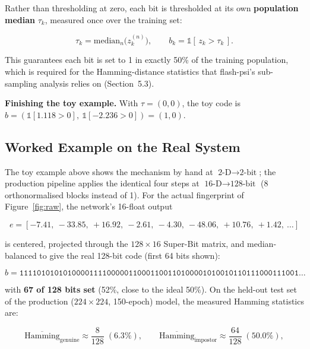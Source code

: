 \documentclass[11pt]{article}
\begin{document}
Rather than thresholding at zero, each bit is thresholded at its own \textbf{population
median} $\tau_k$, measured once over the training set:

\begin{equation}
\tau_k = \mathrm{median}_n\big(z_k^{(n)}\big), \qquad
b_k = \mathbb{1}[\,z_k > \tau_k\,].
\end{equation}

This guarantees each bit is set to 1 in exactly 50\% of the training population, which is
required for the Hamming-distance statistics that flash-psi's sub-sampling analysis relies
on (Section~5.3).

\textbf{Finishing the toy example.} With $\tau = (0, 0)$, the toy code is
$b = (\mathbb{1}[1.118>0],\ \mathbb{1}[-2.236>0]) = (1, 0)$.

\subsection{Worked Example on the Real System}

The toy example above shows the mechanism by hand at $\text{2-D}\to\text{2-bit}$; the
production pipeline applies the identical four steps at
$\text{16-D}\to\text{128-bit}$ (8 orthonormalised blocks instead of 1). For the actual
fingerprint of Figure~\ref{fig:raw}, the network's 16-float output

\begin{equation}
e = [-7.41,\ -33.85,\ +16.92,\ -2.61,\ -4.30,\ -48.06,\ +10.76,\ +1.42,\ \ldots]
\end{equation}

is centered, projected through the $128\times16$ Super-Bit matrix, and median-balanced to
give the real 128-bit code (first 64 bits shown):

\begin{equation}
b = \texttt{1111010101010000111100000110001100110100001010010110111000111001\ldots}
\end{equation}

with \textbf{67 of 128 bits set} (52\%, close to the ideal 50\%). On the held-out test set
of the production ($224\times224$, 150-epoch) model, the measured Hamming statistics are:

\begin{equation}
\overline{\mathrm{Hamming}}_{\text{genuine}} \approx \frac{8}{128} \;(6.3\%), \qquad
\overline{\mathrm{Hamming}}_{\text{impostor}} \approx \frac{64}{128} \;(50.0\%),
\end{equation}
\end{document}
